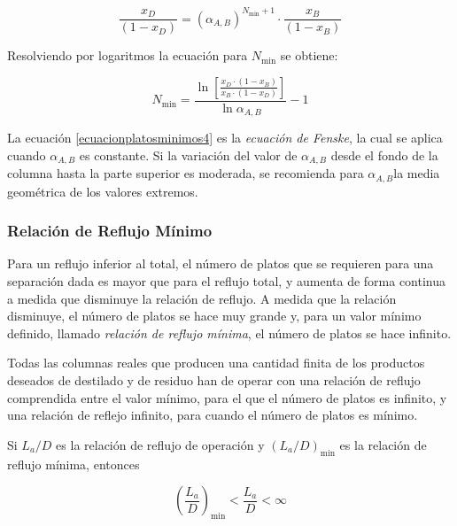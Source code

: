 \documentclass[11pt]{book}
\begin{document}
\begin{equation}
    \label{ecuacionplatosminimos3}
    \frac{x_{D}}{(1-x_{D})} = (\alpha_{A,B})^{N_{\textrm{min}}+1} \cdot \frac{x_{B}}{(1-x_{B})}
\end{equation}

Resolviendo por logaritmos la ecuación para $N_{\textrm{min}}$ se obtiene:

\begin{equation}
     \label{ecuacionplatosminimos4}
     N_{\textrm{min}} = \frac{\ln{\left[\frac{x_D \cdot (1-x_B)}{x_B \cdot (1-x_D)}\right]}}{\ln{\alpha_{A,B}}}-1
\end{equation}

La ecuación \ref{ecuacionplatosminimos4} es la \textit{ecuación de Fenske}, la cual se aplica cuando $\alpha_{A,B}$ es constante. Si la variación del valor de $\alpha_{A,B}$ desde el fondo de la columna hasta la parte superior es moderada, se recomienda para $\alpha_{A,B}$la media geométrica de los valores extremos.


\subsubsection{Relación de Reflujo Mínimo}

Para un reflujo inferior al total, el número de platos que se requieren para una separación dada es mayor que para el reflujo total, y aumenta de forma continua a medida que disminuye la relación de reflujo. A medida que la relación disminuye, el número de platos se hace muy grande y, para un valor mínimo definido, llamado \textit{relación de reflujo mínima}, el número de platos se hace infinito. 

Todas las columnas reales que producen una cantidad finita de los productos deseados de destilado y de residuo han de operar con una relación de reflujo comprendida entre el valor mínimo, para el que el número de platos es infinito, y una relación de reflejo infinito, para cuando el número de platos es mínimo.

Si $L_a/D$ es la relación de reflujo de operación y $(L_a/D)_{\textrm{min}}$ es la relación de reflujo mínima, entonces

\begin{equation}
    \label{eq:EcuacionReflujoMinimoDestilacion}
    \left( \frac{L_a}{D} \right)_{\textrm{min}} < \frac{L_a}{D} < \infty
\end{equation}
\end{document}
